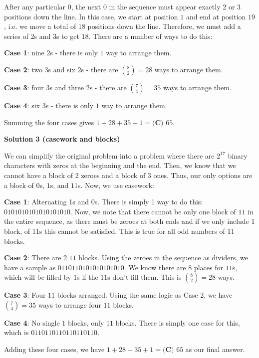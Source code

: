 \begin{enumerate}
After any particular $0$, the next $0$ in the sequence must appear exactly $2$ or $3$ positions down the line. In this case, we start at position $1$ and end at position $19$, i.e. we move a total of $18$ positions down the line. Therefore, we must add a series of $2$s and $3$s to get $18$. There are a number of ways to do this:

 \textbf{Case 1}: nine $2$s - there is only $1$ way to arrange them.

 \textbf{Case 2}: two $3$s and six $2$s - there are ${8\choose2} = 28$ ways to arrange them.

 \textbf{Case 3}: four $3$s and three $2$s - there are ${7\choose4} = 35$ ways to arrange them.

 \textbf{Case 4}: six $3$s - there is only $1$ way to arrange them.

 Summing the four cases gives $1+28+35+1=\boxed{\textbf{(C) }65}$.

 



\textbf{Solution 3 (casework and blocks)}

We can simplify the original problem into a problem where there are $2^{17}$ binary characters with zeros at the beginning and the end. Then, we know that we cannot have a block of 2 zeroes and a block of 3 ones. Thus, our only options are a block of $0$s, $1$s, and $11$s. Now, we use casework: 

 \textbf{Case 1}: Alternating 1s and 0s. There is simply 1 way to do this: $0101010101010101010$. Now, we note that there cannot be only one block of $11$ in the entire sequence, as there must be zeroes at both ends and if we only include 1 block, of $11$s this cannot be satisfied. This is true for all odd numbers of $11$ blocks. 

 \textbf{Case 2}: There are 2 $11$ blocks. Using the zeroes in the sequence as dividers, we have a sample as $0110110101010101010$. We know there are 8 places for $11$s, which will be filled by $1$s if the $11$s don't fill them. This is ${8\choose2} = 28$ ways. 

 \textbf{Case 3}: Four $11$ blocks arranged. Using the same logic as Case 2, we have ${7\choose4} = 35$ ways to arrange four $11$ blocks. 

 \textbf{Case 4}: No single $1$ blocks, only $11$ blocks. There is simply one case for this, which is $0110110110110110110$. 

 Adding these four cases, we have $1+28+35+1=\boxed{\textbf{(C) }65}$ as our final answer. 


\end{enumerate}
